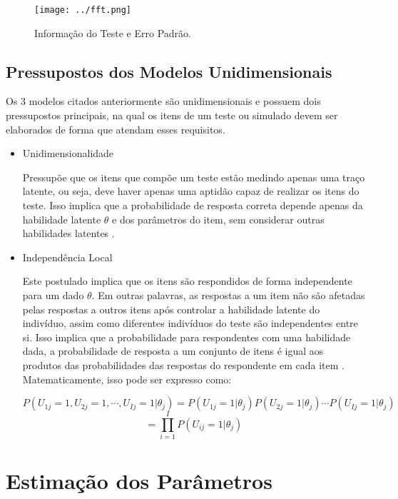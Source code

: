 \begin{figure}[H]
	\centering
	\caption{Informação do Teste e Erro Padrão.}
	\texttt{[image: ../fft.png]}
		\parbox{\textwidth}{
		\centering %
	}
	\label{fig:fft}
\end{figure}



\subsection{Pressupostos dos Modelos Unidimensionais}

Os 3 modelos citados anteriormente são unidimensionais e possuem dois pressupostos principais, na qual os itens de um teste ou simulado devem ser elaborados de forma que atendam esses requisitos. 

\begin{itemize}
	
\item  Unidimensionalidade

Pressupõe que os itens que compõe um teste estão medindo apenas uma traço latente, ou seja, deve haver apenas uma aptidão capaz de realizar os itens do teste. Isso implica que a probabilidade de resposta correta depende apenas da habilidade latente $\theta$ e dos parâmetros do item, sem considerar outras habilidades latentes \cite{pasquali1996}.

\item  Independência Local

Este postulado implica que os itens são respondidos de forma independente para um dado $\theta$. Em outras palavras, as respostas a um item não são afetadas pelas respostas a outros itens após controlar a habilidade latente do indivíduo, assim como diferentes indivíduos do teste são independentes entre si. Isso implica que a probabilidade para respondentes com uma habilidade dada, a probabilidade de resposta a um conjunto de itens é igual aos produtos das probabilidades das respostas do respondente em cada item \cite{pasquali1996}. Matematicamente, isso pode ser expresso como:


\[
 P(U_{1j} = 1, U_{2j} = 1, \cdots, U_{Ij} = 1 |\theta_j) = 
 P(U_{1j} = 1|\theta_j)  P(U_{2j} = 1|\theta_j) \cdots P(U_{Ij} = 1|\theta_j) 
\] 
\[
 = \prod_{i=1}^{I}P(U_{ij} = 1|\theta_j) 
\]

\end{itemize}
\section{Estimação dos Parâmetros}



